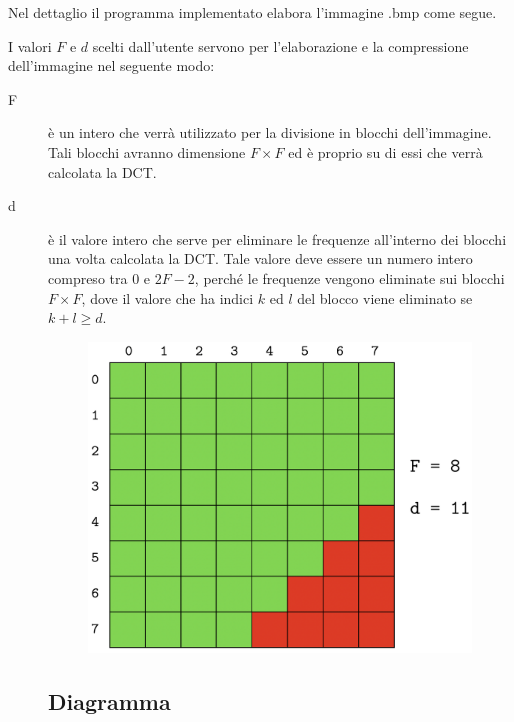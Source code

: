 \documentclass[preprint,12pt]{elsarticle}
\begin{document}
Nel dettaglio il programma implementato elabora l'immagine .bmp come segue.

I valori $F$ e $d$ scelti dall'utente servono per l'elaborazione e la compressione dell'immagine nel seguente modo:
\begin{description}
\item[F] è un intero che verrà utilizzato per la divisione in blocchi dell'immagine. Tali blocchi avranno dimensione $F \times F$ ed è proprio su di essi che verrà calcolata la DCT.
\item[d] è il valore intero che serve per eliminare le frequenze all'interno dei blocchi una volta calcolata la DCT. Tale valore deve essere un numero intero compreso tra $0$ e $2F-2$, perché le frequenze vengono eliminate sui blocchi $F \times F$, dove il valore che ha indici $k$ ed $l$ del blocco viene eliminato se $k + l \geq d$. 
\begin{figure}[H]
	\centering
	\includegraphics[width=0.5\linewidth]{esempio}
\end{figure}
\subsection{Diagramma}

\vspace{3mm}


\end{description}
\end{document}
